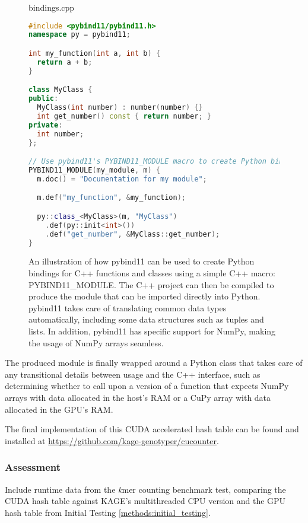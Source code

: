 \begin{figure}[H]
\begin{center}
bindings.cpp
\end{center}
\begin{lstlisting}[language=C++,style=cppcode]
#include <pybind11/pybind11.h>
namespace py = pybind11;

int my_function(int a, int b) {
  return a + b;
}

class MyClass {
public:
  MyClass(int number) : number(number) {}
  int get_number() const { return number; } 
private:
  int number;
};

// Use pybind11's PYBIND11_MODULE macro to create Python bindings for our simple function and class
PYBIND11_MODULE(my_module, m) {
  m.doc() = "Documentation for my module";

  m.def("my_function", &my_function);

  py::class_<MyClass>(m, "MyClass")
    .def(py::init<int>())
    .def("get_number", &MyClass::get_number);
}
\end{lstlisting}
\caption{
  An illustration of how pybind11 can be used to create Python bindings for C++ functions and classes using a simple C++ macro: PYBIND11\_MODULE.
  The C++ project can then be compiled to produce the module that can be imported directly into Python.
  pybind11 takes care of translating common data types automatically, including some data structures such as tuples and lists.
  In addition, pybind11 has specific support for NumPy, making the usage of NumPy arrays seamless.
}
\label{methods:gpu_accelerating_kmer_counting:figures:pybind11_example}
\end{figure}

The produced module is finally wrapped around a Python class that takes care of any transitional details between usage and the C++ interface, such as determining whether to call upon a version of a function that expects NumPy arrays with data allocated in the host's RAM or a CuPy array with data allocated in the GPU's RAM.

The final implementation of this CUDA accelerated hash table can be found and installed at \url{https://github.com/kage-genotyper/cucounter}.

\subsubsection{Assessment}
Include runtime data from the \textit{k}mer counting benchmark test, comparing the CUDA hash table against KAGE's multithreaded CPU version and the GPU hash table from Initial Testing \ref{methods:initial_testing}.

